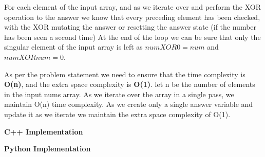 \Correctness
For each element of the input array, and as we iterate over and perform the XOR operation to the answer we know that every preceding element has been checked, with the XOR mutating the answer or resetting the answer state (if the number has been seen a second time)
At the end of the loop we can be sure that only the singular element of the input array is left as $num XOR 0 = num$ and $num XOR num = 0$.

\Complexity
As per the problem statement we need to ensure that the time complexity is \textbf{O(n)}, and the extra space complexity is \textbf{O(1)}. let n be the number of elements in the input nums array. As we iterate over the array in a single pass, we maintain O(n) time complexity. As we create only a single answer variable and update it as we iterate we maintain the extra space complexity of O(1).

\bigskip
\noindent\textbf{C++ Implementation}



\bigskip
\noindent\textbf{Python Implementation}



\ProblemDivider
